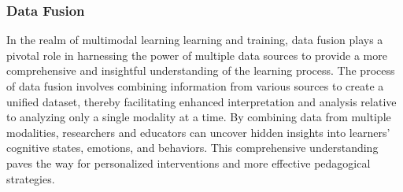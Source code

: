 \documentclass[manuscript,screen,review]{acmart}
\begin{document}
\subsubsection{Data Fusion} \label{subsec:data_fusion}


In the realm of multimodal learning learning and training, data fusion plays a pivotal role in harnessing the power of multiple data sources to provide a more comprehensive and insightful understanding of the learning process. The process of data fusion involves combining information from various sources to create a unified dataset, thereby facilitating enhanced interpretation and analysis relative to analyzing only a single modality at a time. By combining data from multiple modalities, researchers and educators can uncover hidden insights into learners' cognitive states, emotions, and behaviors. This comprehensive understanding paves the way for personalized interventions and more effective pedagogical strategies. 
\end{document}
